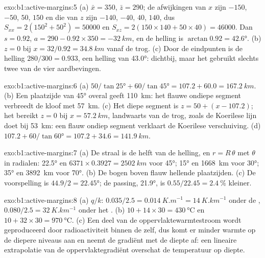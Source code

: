 \begin{solution}{exo:b1:active-margins:5}
(a) $\bar x = 350$, $\bar z = 290$; de afwijkingen van $x$ zijn $-150$, $-50$,
$50$, $150$ en die van $z$ zijn $-140$, $-40$, $40$, $140$, dus
$S_{xx} = 2(150^2 + 50^2) = \num{50000}$ en
$S_{xz} = 2(150\times140 + 50\times40) = \num{46000}$. Dan $s = 0.92$,
$a = 290 - 0.92\times350 = \qty{-32}{km}$, en de helling is
$\arctan 0.92 = \ang{42.6}$. (b) $z = 0$ bij $x = 32/0.92 = \qty{34.8}{km}$
vanaf de trog. (c) Door de eindpunten is de helling $280/300 = 0.933$, een
helling van \ang{43.0}: dichtbij, maar het gebruikt slechts twee van de vier aardbevingen.
\end{solution}

\begin{solution}{exo:b1:active-margins:6}
(a) $50/\tan\ang{25} + 60/\tan\ang{45} = 107.2 + 60.0 = \qty{167.2}{km}$.
(b) Een plaatzijde van \ang{45} overal geeft \qty{110}{km}: het flauwe ondiepe segment verbreedt de kloof met \qty{57}{km}. (c) Het diepe segment is
$z = 50 + (x - 107.2)$; het bereikt $z = 0$ bij $x = \qty{57.2}{km}$, landwaarts van de trog, zoals de Koerilese lijn doet bij \qty{53}{km}: een flauw ondiep segment verklaart de Koerilese verschuiving. (d) $107.2 + 60/\tan\ang{60} = 107.2 + 34.6 =
\qty{141.9}{km}$.
\end{solution}

\begin{solution}{exo:b1:active-margins:7}
(a) De straal is de helft van de helling, en $r = R\,\theta$ met $\theta$ in radialen:
\ang{22.5} en $6371\times0.3927 = \qty{2502}{km}$ voor \ang{45}; \ang{15} en
\qty{1668}{km} voor \ang{30}; \ang{35} en \qty{3892}{km} voor \ang{70}.
(b) De bogen boven flauw hellende plaatzijden. (c) De voorspelling is
$44.9/2 = \ang{22.45}$; de passing, \ang{21.9}, is
$0.55/22.45 = \qty{2.4}{\percent}$ kleiner.
\end{solution}

\begin{solution}{exo:b1:active-margins:8}
(a) $q/k$: $0.035/2.5 = \qty{0.014}{K.m^{-1}} = \qty{14}{K.km^{-1}}$ onder
de , $0.080/2.5 = \qty{32}{K.km^{-1}}$ onder het .
(b) $10 + 14\times30 = \qty{430}{\celsius}$ en
$10 + 32\times30 = \qty{970}{\celsius}$. (c) Een deel van de oppervlaktewarmtestroom wordt geproduceerd door radioactiviteit binnen de  zelf, dus komt er minder warmte op de diepere niveaus aan en neemt de gradiënt met de diepte af: een lineaire extrapolatie van de oppervlaktegradiënt overschat de temperatuur op diepte.
\end{solution}

